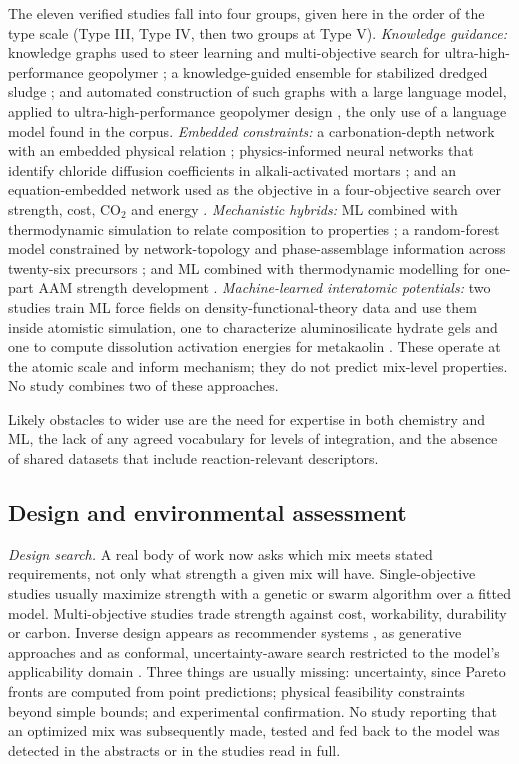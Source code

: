 \documentclass[pdflatex,sn-basic]{sn-jnl}
\begin{document}
The eleven verified studies fall into four groups, given here in the order of the type scale (Type III, Type IV, then two groups at Type V). \emph{Knowledge guidance:} knowledge graphs used to steer learning and multi-objective search for ultra-high-performance geopolymer \citep{guo2024}; a knowledge-guided ensemble for stabilized dredged sludge \citep{su2026}; and automated construction of such graphs with a large language model, applied to ultra-high-performance geopolymer design \citep{jiang2026}, the only use of a language model found in the corpus. \emph{Embedded constraints:} a carbonation-depth network with an embedded physical relation \citep{liu2025}; physics-informed neural networks that identify chloride diffusion coefficients in alkali-activated mortars \citep{wan2025}; and an equation-embedded network used as the objective in a four-objective search over strength, cost, CO$_2$ and energy \citep{guo2026}. \emph{Mechanistic hybrids:} ML combined with thermodynamic simulation to relate composition to properties \citep{ke2021}; a random-forest model constrained by network-topology and phase-assemblage information across twenty-six precursors \citep{bhat2022}; and ML combined with thermodynamic modelling for one-part AAM strength development \citep{pei2026}. \emph{Machine-learned interatomic potentials:} two studies train ML force fields on density-functional-theory data and use them inside atomistic simulation, one to characterize aluminosilicate hydrate gels \citep{li2026mlp} and one to compute dissolution activation energies for metakaolin \citep{izadifar2025}. These operate at the atomic scale and inform mechanism; they do not predict mix-level properties. No study combines two of these approaches.

Likely obstacles to wider use are the need for expertise in both chemistry and ML, the lack of any agreed vocabulary for levels of integration, and the absence of shared datasets that include reaction-relevant descriptors.

\subsection{Design and environmental assessment}\label{sec:env}

\emph{Design search.} A real body of work now asks which mix meets stated requirements, not only what strength a given mix will have. Single-objective studies usually maximize strength with a genetic or swarm algorithm over a fitted model. Multi-objective studies trade strength against cost, workability, durability or carbon. Inverse design appears as recommender systems \citep{natarajan2026}, as generative approaches \citep{gu2025} and as conformal, uncertainty-aware search restricted to the model's applicability domain \citep{jagad2026}. Three things are usually missing: uncertainty, since Pareto fronts are computed from point predictions; physical feasibility constraints beyond simple bounds; and experimental confirmation. No study reporting that an optimized mix was subsequently made, tested and fed back to the model was detected in the abstracts or in the studies read in full.
\end{document}
